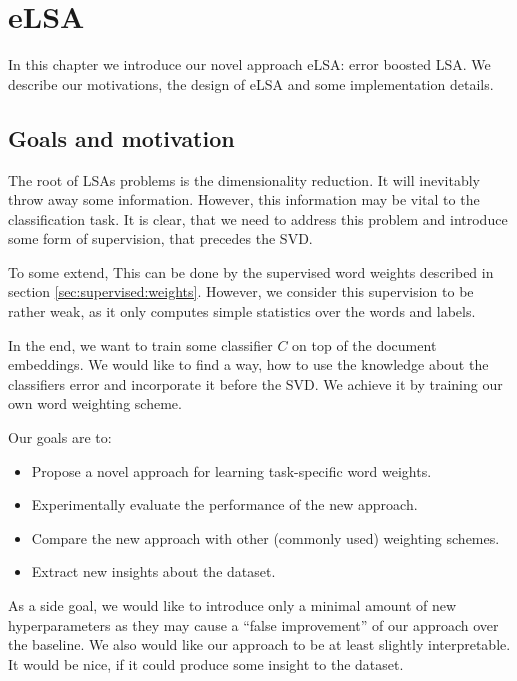 \chapter{eLSA}

In this chapter we introduce our novel approach eLSA: error boosted LSA.
We describe our motivations, the design of eLSA and some implementation details.

\section{Goals and motivation}

    The root of LSAs problems is the dimensionality reduction.
    It will inevitably throw away some information. 
    However, this information may be vital to the classification task. 
    It is clear, that we need to address this problem and introduce some form of supervision, that precedes the SVD.
    
    To some extend, This can be done by the supervised word weights described in section \ref{sec:supervised:weights}.
    However, we consider this supervision to be rather weak, as it only computes simple statistics over the words and labels.
    
    In the end, we want to train some classifier $C$ on top of the document embeddings.
    We would like to find a way, how to use the knowledge about the classifiers error and incorporate it before the SVD.
    We achieve it by training our own word weighting scheme. 
    
    Our goals are to:
    \begin{itemize}
        \item Propose a novel approach for learning task-specific word weights.
        \item Experimentally evaluate the performance of the new approach.
        \item Compare the new approach with other (commonly used) weighting schemes. 
        \item Extract new insights about the dataset.
    \end{itemize}
    
    As a side goal, we would like to introduce only a minimal amount of new hyperparameters
    as they may cause a ``false improvement'' of our approach over the baseline.
    We also would like our approach to be at least slightly interpretable.
    It would be nice, if it could produce some insight to the dataset.
    
